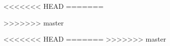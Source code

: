 



\makeindex



	\frontmatter
		
		
		\begin{singlespace}			
			\tableofcontents
		\end{singlespace}

	
	\mainmatter
		
		
		
<<<<<<< HEAD
=======
		
		
		
>>>>>>> master
		
		
	\appendix	
<<<<<<< HEAD
=======
		\listofbibliographyentries
>>>>>>> master
		\listoffigures
		\listoftables
	
